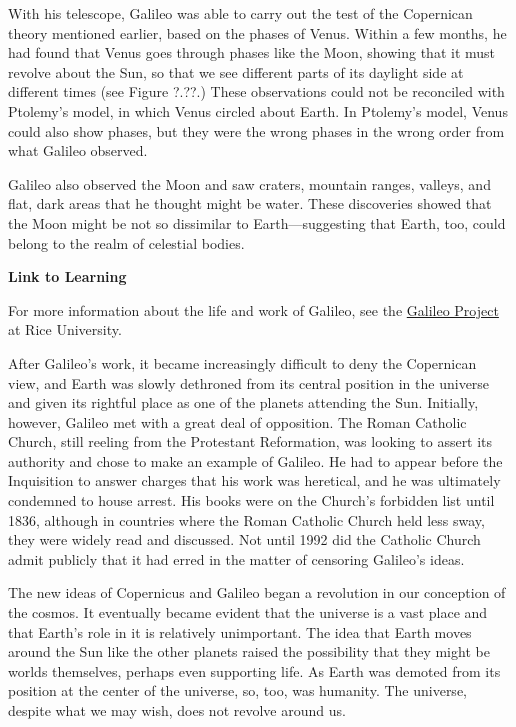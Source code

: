 \documentclass[../../main-astronomy.tex]{subfiles}
\begin{document}
With his telescope, Galileo was able to carry out the test of the Copernican theory mentioned earlier, based on the phases of Venus. Within a few months, he had found that Venus goes through phases like the Moon, showing that it must revolve about the Sun, so that we see different parts of its daylight side at different times (see Figure ?.??.) These observations could not be reconciled with Ptolemy's model, in which Venus circled about Earth. In Ptolemy's model, Venus could also show phases, but they were the wrong phases in the wrong order from what Galileo observed.

\vspace{1em}

Galileo also observed the Moon and saw craters, mountain ranges, valleys, and flat, dark areas that he thought might be water. These discoveries showed that the Moon might be not so dissimilar to Earth---suggesting that Earth, too, could belong to the realm of celestial bodies.

\begin{mdframed}[backgroundcolor=black!10]
    \textbf{Link to Learning}

    \vspace{1ex}

    For more information about the life and work of Galileo, see the \href{https://openstax.org/l/30GalProj}{Galileo Project} at Rice University.
\end{mdframed}

After Galileo's work, it became increasingly difficult to deny the Copernican view, and Earth was slowly dethroned from its central position in the universe and given its rightful place as one of the planets attending the Sun. Initially, however, Galileo met with a great deal of opposition. The Roman Catholic Church, still reeling from the Protestant Reformation, was looking to assert its authority and chose to make an example of Galileo. He had to appear before the Inquisition to answer charges that his work was heretical, and he was ultimately condemned to house arrest. His books were on the Church's forbidden list until 1836, although in countries where the Roman Catholic Church held less sway, they were widely read and discussed. Not until 1992 did the Catholic Church admit publicly that it had erred in the matter of censoring Galileo's ideas.

\vspace{1em}

The new ideas of Copernicus and Galileo began a revolution in our conception of the cosmos. It eventually became evident that the universe is a vast place and that Earth's role in it is relatively unimportant. The idea that Earth moves around the Sun like the other planets raised the possibility that they might be worlds themselves, perhaps even supporting life. As Earth was demoted from its position at the center of the universe, so, too, was humanity. The universe, despite what we may wish, does not revolve around us.
\end{document}
